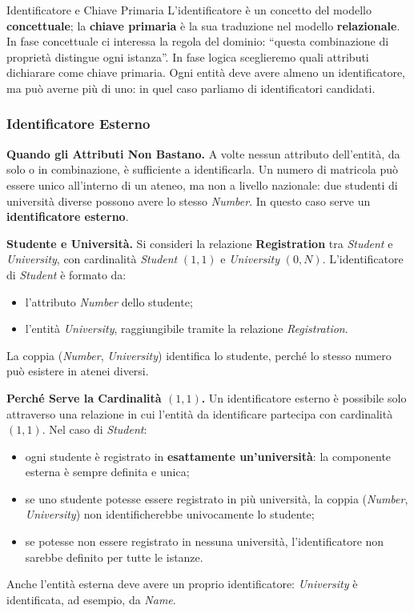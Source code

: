 \documentclass[12pt]{extarticle}
\begin{document}
\begin{cbox}{Identificatore e Chiave Primaria}
\noindent L'identificatore è un concetto del modello \textbf{concettuale}; la \textbf{chiave primaria} è la sua traduzione nel modello \textbf{relazionale}. In fase concettuale ci interessa la regola del dominio: ``questa combinazione di proprietà distingue ogni istanza''. In fase logica sceglieremo quali attributi dichiarare come chiave primaria. Ogni entità deve avere almeno un identificatore, ma può averne più di uno: in quel caso parliamo di identificatori candidati.
\end{cbox}

\subsubsection{Identificatore Esterno}

\noindent \textbf{Quando gli Attributi Non Bastano.} A volte nessun attributo dell'entità, da solo o in combinazione, è sufficiente a identificarla. Un numero di matricola può essere unico all'interno di un ateneo, ma non a livello nazionale: due studenti di università diverse possono avere lo stesso \textit{Number}. In questo caso serve un \textbf{identificatore esterno}.

\medskip
\noindent \textbf{Studente e Università.} Si consideri la relazione \textbf{Registration} tra \textit{Student} e \textit{University}, con cardinalità \textit{Student} $(1,1)$ e \textit{University} $(0,N)$. L'identificatore di \textit{Student} è formato da:
\begin{itemize}
    \item l'attributo \textit{Number} dello studente;
    \item l'entità \textit{University}, raggiungibile tramite la relazione \textit{Registration}.
\end{itemize}
La coppia (\textit{Number}, \textit{University}) identifica lo studente, perché lo stesso numero può esistere in atenei diversi.

\medskip
\noindent \textbf{Perché Serve la Cardinalità $(1,1)$.} Un identificatore esterno è possibile solo attraverso una relazione in cui l'entità da identificare partecipa con cardinalità \textbf{$(1,1)$}. Nel caso di \textit{Student}:
\begin{itemize}
    \item ogni studente è registrato in \textbf{esattamente un'università}: la componente esterna è sempre definita e unica;
    \item se uno studente potesse essere registrato in più università, la coppia (\textit{Number}, \textit{University}) non identificherebbe univocamente lo studente;
    \item se potesse non essere registrato in nessuna università, l'identificatore non sarebbe definito per tutte le istanze.
\end{itemize}
Anche l'entità esterna deve avere un proprio identificatore: \textit{University} è identificata, ad esempio, da \textit{Name}.
\end{document}
